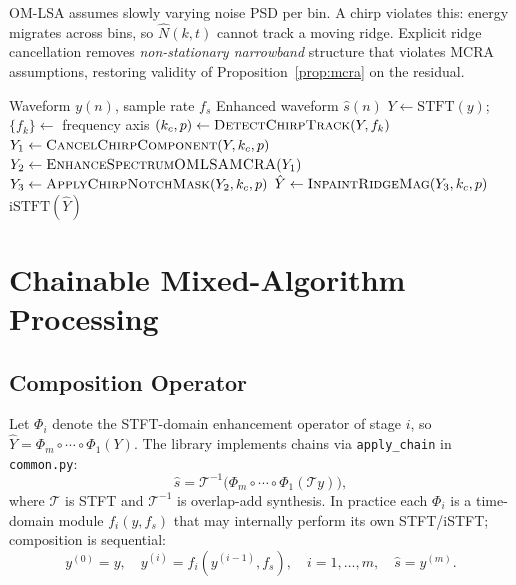 \begin{proposition}
\label{prop:chirp}
OM-LSA assumes slowly varying noise PSD per bin. A chirp violates this: energy migrates across bins, so $\hat{N}(k,t)$ cannot track a moving ridge. Explicit ridge cancellation removes \emph{non-stationary narrowband} structure that violates MCRA assumptions, restoring validity of Proposition~\ref{prop:mcra} on the residual.
\end{proposition}

\begin{algorithm}[H]
  \caption{Four-stage chirp suppression (\texttt{chirp\_notch})}
  \label{alg:chirp}
  \begin{algorithmic}[1]
    \Require Waveform $y(n)$, sample rate $f_s$
    \Ensure Enhanced waveform $\hat{s}(n)$
    \State $Y \gets \mathrm{STFT}(y)$;\quad $\{f_k\} \gets$ frequency axis
    \State $(k_c, p) \gets \textsc{DetectChirpTrack}(Y, f_k)$ 
    \State $Y_1 \gets \textsc{CancelChirpComponent}(Y, k_c, p)$ 
    \State $Y_2 \gets \textsc{EnhanceSpectrumOMLSAMCRA}(Y_1)$
    \State $Y_3 \gets \textsc{ApplyChirpNotchMask}(Y_2, k_c, p)$
    \State $\hat{Y} \gets \textsc{InpaintRidgeMag}(Y_3, k_c, p)$ 
    \State \Return $\mathrm{iSTFT}(\hat{Y})$
  \end{algorithmic}
\end{algorithm}

\section{Chainable Mixed-Algorithm Processing}
\label{sec:chains}

\subsection{Composition Operator}

Let $\Phi_i$ denote the STFT-domain enhancement operator of stage $i$, so $\hat{Y}=\Phi_m\circ\cdots\circ\Phi_1(Y)$. The library implements chains via \texttt{apply\_chain} in \texttt{common.py}:
\begin{equation}
  \hat{s} = \mathcal{T}^{-1}\bigl(\Phi_m \circ \cdots \circ \Phi_1(\mathcal{T}y)\bigr),
\end{equation}
where $\mathcal{T}$ is STFT and $\mathcal{T}^{-1}$ is overlap-add synthesis. In practice each $\Phi_i$ is a time-domain module $f_i(y,f_s)$ that may internally perform its own STFT/iSTFT; composition is sequential:
\begin{equation}
  y^{(0)}=y, \quad y^{(i)}=f_i(y^{(i-1)}, f_s),\quad i=1,\ldots,m, \quad \hat{s}=y^{(m)}.
  \label{eq:chain_compose}
\end{equation}

